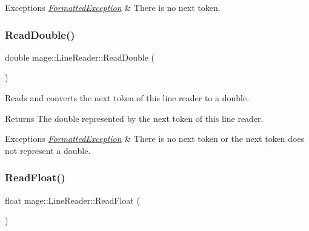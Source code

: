 \begin{DoxyExceptions}{Exceptions}
{\em \hyperlink{structmage_1_1_formatted_exception}{Formatted\+Exception}} & There is no next token. \\
\hline
\end{DoxyExceptions}
\hypertarget{classmage_1_1_line_reader_a17f11afdea4692395115c6bdfde03660}{}\label{classmage_1_1_line_reader_a17f11afdea4692395115c6bdfde03660} 
\subsubsection{\texorpdfstring{Read\+Double()}{ReadDouble()}}
{\footnotesize\ttfamily double mage\+::\+Line\+Reader\+::\+Read\+Double (\begin{DoxyParamCaption}{ }\end{DoxyParamCaption})\hspace{0.3cm}{\ttfamily [protected]}}

Reads and converts the next token of this line reader to a {\ttfamily double}.

\begin{DoxyReturn}{Returns}
The {\ttfamily double} represented by the next token of this line reader. 
\end{DoxyReturn}

\begin{DoxyExceptions}{Exceptions}
{\em \hyperlink{structmage_1_1_formatted_exception}{Formatted\+Exception}} & There is no next token or the next token does not represent a {\ttfamily double}. \\
\hline
\end{DoxyExceptions}
\hypertarget{classmage_1_1_line_reader_ae691928873b110dd273e72a47f2008cb}{}\label{classmage_1_1_line_reader_ae691928873b110dd273e72a47f2008cb} 
\subsubsection{\texorpdfstring{Read\+Float()}{ReadFloat()}}
{\footnotesize\ttfamily float mage\+::\+Line\+Reader\+::\+Read\+Float (\begin{DoxyParamCaption}{ }\end{DoxyParamCaption})\hspace{0.3cm}{\ttfamily [protected]}}

